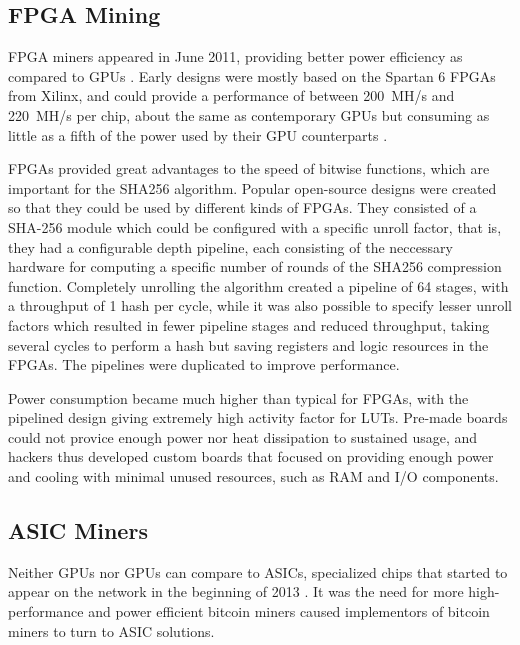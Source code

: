 \subsection{FPGA Mining}

FPGA miners appeared in June 2011, providing better power efficiency as compared to GPUs \cite{bespoke-silicon}.
Early designs were mostly based on the Spartan 6 FPGAs from Xilinx, and could provide a
performance of between 200~MH/s and 220~MH/s per chip, about the same as contemporary GPUs \cite{bitcoin-hardware-cmp}
but consuming as little as a fifth of the power used by their GPU counterparts \cite{bespoke-silicon}.


FPGAs provided great advantages to the speed of bitwise functions, which are important for
the SHA256 algorithm. Popular open-source designs were created so that they could be used
by different kinds of FPGAs. They consisted of a SHA-256 module which could be configured
with a specific unroll factor, that is, they had a configurable depth pipeline, each
consisting of the neccessary hardware for computing a specific number of rounds of the
SHA256 compression function. Completely unrolling the algorithm created a pipeline of
64 stages, with a throughput of 1 hash per cycle, while it was also possible to specify
lesser unroll factors which resulted in fewer pipeline stages and reduced throughput, taking
several cycles to perform a hash but saving registers and logic resources in the FPGAs.
The pipelines were duplicated to improve performance.

Power consumption became much higher than typical for FPGAs, with the pipelined design
giving extremely high activity factor for LUTs. Pre-made boards could not provice enough
power nor heat dissipation to sustained usage, and hackers thus developed custom
boards that focused on providing enough power and cooling with minimal unused resources,
such as RAM and I/O components. \cite{bespoke-silicon}

\subsection{ASIC Miners}

Neither GPUs nor GPUs can compare to ASICs, specialized chips that started to appear on the network
in the beginning of 2013 \cite{first-asic-miner}. It was the need for more high-performance and power
efficient bitcoin miners caused implementors of bitcoin miners to turn to ASIC solutions.

